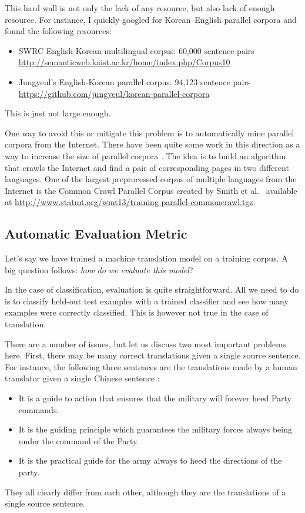 \documentclass{report}
\begin{document}
This hard wall is not only the lack of any resource, but also lack of enough
resource. For instance, I quickly googled for Korean--English parallel corpora
and found the following resources:
\begin{itemize}
    \item SWRC English-Korean multilingual corpus: 60,000 sentence pairs
        \url{http://semanticweb.kaist.ac.kr/home/index.php/Corpus10}
    \item Jungyeul's English-Korean parallel corpus: 94,123 sentence pairs
        \url{https://github.com/jungyeul/korean-parallel-corpora}
\end{itemize}
This is just not large enough. 

One way to avoid this or mitigate this problem is to automatically mine parallel
corpora from the Internet. There have been quite some work in this direction as
a way to increase the size of parallel corpora
\cite{resnik2003web,zhang2006automatic}. The idea is to build an algorithm that
crawls the Internet and find a pair of corresponding pages in two different
languages. One of the largest preprocessed corpus of multiple languages from the
Internet is the Common Crawl Parallel Corpus created by Smith et
al.~\cite{smith2013dirt} available at
\url{http://www.statmt.org/wmt13/training-parallel-commoncrawl.tgz}.




\subsection{Automatic Evaluation Metric}

Let's say we have trained a machine translation model on a training corpus. A
big question follows: {\em how do we evaluate this model}?

In the case of classification, evaluation is quite straightforward. All we need
to do is to classify held-out test examples with a trained classifier and see
how many examples were correctly classified. This is however not true in the
case of translation. 

There are a number of issues, but let us discuss two most important problems
here. First, there may be many correct translations given a single source
sentence. For instance, the following three sentences are the translations made
by a human translator given a single Chinese sentence \cite{papineni2002bleu}:
\begin{itemize}
    \itemsep 0em
    \item It is a guide to action that ensures that the military will forever
        heed Party commands.
    \item It is the guiding principle which guarantees the military forces
        always being under the command of the Party.
    \item It is the practical guide for the army always to heed the directions
        of the party.
\end{itemize}
They all clearly differ from each other, although they are the translations of a
single source sentence. 
\end{document}
